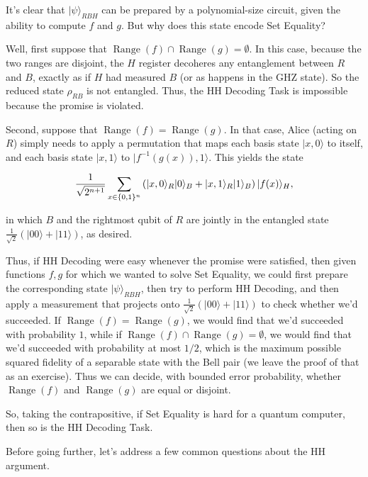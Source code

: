 \documentclass[11pt]{report}
\theoremstyle{plain}
\theoremstyle{definition}
\renewcommand{\ket}[1]{|#1\rangle}
\begin{document}
It's clear that $\ket{\psi}_{RBH}$ can be prepared by a polynomial-size circuit, given the ability to compute $f$ and $g$.  But why
does this state encode Set Equality?

Well, first suppose that $\operatorname*{Range}(f) \cap \operatorname*{Range}(g) = \emptyset$.
In this case, because the two ranges are disjoint, the $H$ register decoheres
any entanglement between $R$ and $B$, exactly as if $H$ had measured $B$ (or as happens in the GHZ state).
So the reduced state $\rho_{RB}$ is not entangled.  Thus, the HH Decoding Task is impossible because the promise is violated.

Second, suppose that $\operatorname*{Range}(f)=\operatorname*{Range}(g)$.
In that case, Alice (acting on $R$) simply needs to apply a permutation that maps each basis state $\ket{x,0}$ to itself,
and each basis state $\ket{x,1}$ to $\ket{f^{-1}(g(x)),1}$.  This yields the state

$${1 \over \sqrt{2^{n+1}}}
\sum_{x\in\{0,1\}^n} \left( \ket{x,0}_R \ket{0}_B + \ket{x,1}_R \ket{1}_B \right) \ket{f(x)}_H,
$$

\noindent in which $B$ and the rightmost qubit of $R$ are jointly in the entangled state $\frac{1}{\sqrt{2}}(\ket{00} + \ket{11})$, as desired.

Thus, if HH Decoding were easy whenever the promise were satisfied, then given functions $f,g$ for which we wanted to solve Set Equality,
we could first prepare the corresponding state $\ket{\psi}_{RBH}$, then try to perform HH Decoding, and then apply a measurement that projects
onto $\frac{1}{\sqrt{2}}(\ket{00} + \ket{11})$ to check whether we'd succeeded.  If $\operatorname*{Range}(f) = \operatorname*{Range}(g)$, we would find that we'd succeeded with probability $1$, while if $\operatorname*{Range}(f) \cap \operatorname*{Range}(g) = \emptyset$, we would find that we'd succeeded with probability at most $1/2$, which is the maximum possible squared fidelity of a separable state with the Bell pair (we leave the proof of that as an exercise).  Thus we can decide, with bounded error probability, whether $\operatorname*{Range}(f)$ and $\operatorname*{Range}(g)$ are equal or disjoint.

So, taking the contrapositive, if Set Equality is hard for a quantum computer, then so is the HH Decoding Task.

Before going further, let's address a few common questions about the HH argument.
\end{document}
